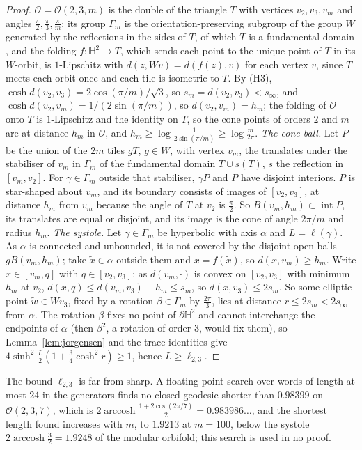 \documentclass[pdflatex,sn-mathphys-num]{sn-jnl}
\theoremstyle{thmstyleone}%
\theoremstyle{thmstylethree}%
\newcommand{\Orb}{\mathcal{O}}
\newcommand{\Hb}{\mathbb{H}^2}
\begin{document}
\begin{proof}
$\Orb=\Orb(2,3,m)$ is the double of the triangle $T$ with vertices $v_2,v_3,v_m$ and angles $\frac\pi2,\frac\pi3,\frac\pi m$; its group $\Gamma_m$ is the orientation-preserving subgroup of the group $W$ generated by the reflections in the sides of $T$, of which $T$ is a fundamental domain \cite{beardon1983}, and the folding $f:\Hb\to T$, which sends each point to the unique point of $T$ in its $W$-orbit, is $1$-Lipschitz with $d(z,Wv)=d(f(z),v)$ for each vertex $v$, since $T$ meets each orbit once and each tile is isometric to $T$. By (H3), $\cosh d(v_2,v_3)=2\cos(\pi/m)/\sqrt3$, so $s_m=d(v_2,v_3)<s_\infty$, and $\cosh d(v_2,v_m)=1/(2\sin(\pi/m))$, so $d(v_2,v_m)=h_m$; the folding of $\Orb$ onto $T$ is $1$-Lipschitz and the identity on $T$, so the cone points of orders $2$ and $m$ are at distance $h_m$ in $\Orb$, and $h_m\ge\log\frac1{2\sin(\pi/m)}\ge\log\frac m{2\pi}$.
\emph{The cone ball.} Let $P$ be the union of the $2m$ tiles $gT$, $g\in W$, with vertex $v_m$, the translates under the stabiliser of $v_m$ in $\Gamma_m$ of the fundamental domain $T\cup s(T)$, $s$ the reflection in $[v_m,v_2]$. For $\gamma\in\Gamma_m$ outside that stabiliser, $\gamma P$ and $P$ have disjoint interiors. $P$ is star-shaped about $v_m$, and its boundary consists of images of $[v_2,v_3]$, at distance $h_m$ from $v_m$ because the angle of $T$ at $v_2$ is $\frac\pi2$. So $B(v_m,h_m)\subset\operatorname{int}P$, its translates are equal or disjoint, and its image is the cone of angle $2\pi/m$ and radius $h_m$.
\emph{The systole.} Let $\gamma\in\Gamma_m$ be hyperbolic with axis $\alpha$ and $L=\ell(\gamma)$. As $\alpha$ is connected and unbounded, it is not covered by the disjoint open balls $gB(v_m,h_m)$; take $\tilde x\in\alpha$ outside them and $x=f(\tilde x)$, so $d(x,v_m)\ge h_m$. Write $x\in[v_m,q]$ with $q\in[v_2,v_3]$; as $d(v_m,\cdot)$ is convex on $[v_2,v_3]$ with minimum $h_m$ at $v_2$, $d(x,q)\le d(v_m,v_3)-h_m\le s_m$, so $d(x,v_3)\le2s_m$. So some elliptic point $\tilde w\in Wv_3$, fixed by a rotation $\beta\in\Gamma_m$ by $\frac{2\pi}3$, lies at distance $r\le2s_m<2s_\infty$ from $\alpha$. The rotation $\beta$ fixes no point of $\partial\Hb$ and cannot interchange the endpoints of $\alpha$ (then $\beta^2$, a rotation of order $3$, would fix them), so Lemma~\ref{lem:jorgensen} and the trace identities give $4\sinh^2\frac L2(1+\frac34\cosh^2r)\ge1$, hence $L\ge\ell_{2,3}$.
\end{proof}

The bound $\ell_{2,3}$ is far from sharp. A floating-point search over words of length at most $24$ in the generators finds no closed geodesic shorter than $0.98399$ on $\Orb(2,3,7)$, which is $2\operatorname{arccosh}\frac{1+2\cos(2\pi/7)}2=0.983986\ldots$, and the shortest length found increases with $m$, to $1.9213$ at $m=100$, below the systole $2\operatorname{arccosh}\frac32=1.9248$ of the modular orbifold; this search is used in no proof.
\end{document}

